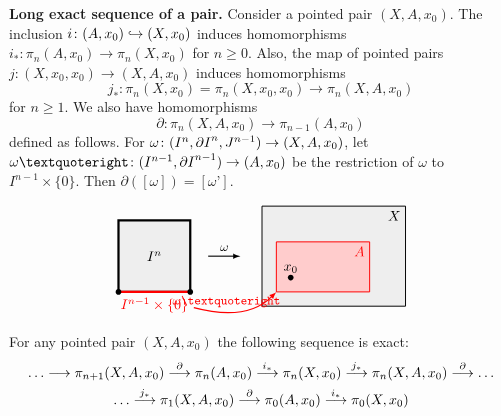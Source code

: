 \begin{nn}{\bf Long exact sequence of a pair.}
Consider a pointed pair $(X, A, x_{0})$. The inclusion $i\colon (A, x_{0}) \hookrightarrow (X, x_{0})$
induces homomorphisms  $i_{\ast}\colon \pi_{n}(A, x_{0}) \to \pi_{n}(X, x_{0})$ for $n\geq 0$. 
Also, the map of pointed pairs $j\colon (X, x_{0}, x_{0}) \to (X, A, x_{0})$ 
induces homomorphisms
\[
j_{\ast}\colon \pi_{n}(X, x_{0}) = \pi_{n}(X, x_{0}, x_{0}) \to \pi_{n}(X, A, x_{0})
\]
for $n\geq 1$. We also have homomorphisms 
\[
\partial \colon \pi_{n}(X, A, x_{0}) \to \pi_{n-1}(A, x_{0})
\]
defined as follows. For $\omega\colon (I^{n}, {\partial I}^{n}, J^{n-1})\to (X, A, x_{0})$, let 
$\omega’\colon (I^{n-1}, \pint^{n-1}) \to (A, x_{0})$ be the restriction of
$\omega$ to $I^{n-1}\times \{0\}$. Then $\partial([\omega]) = [\omega’]$.

\begin{equation*}
\begin{tikzpicture}[
    scale = 1.8,
    d0/.style = {line width = 1.6pt},
    d1/.style= {postaction={decorate}, line width = 1.6pt, decoration={markings, mark=at position 0.55 with {\arrow{stealth}}}},
    d2/.style = {postaction={decorate}, line width = 1.6pt, decoration={markings, mark=at position 0.54 with {\arrow[rotate=9]{stealth}}}},
]

\draw[d0, fill = mygray1] (0,0) rectangle node {$I^{n}$} (1,1);
\draw[d0, red]  (0,0)  --  node[below] {$I^{n-1}\times \{0\}$} (1, 0); 
\fill[] (0, 0) circle (0.04);
\fill[] (1, 0) circle (0.04);

\filldraw[mygray1, draw=black, line width=0.7pt] (2, -0.2) rectangle (4, 1.2);
\filldraw[red!20, draw=red, line width=0.7pt] (2.2, 0.0) rectangle (3.5, 0.7);
\node[anchor=north east, red] at (3.5, 0.7)   {$A$};
\fill[] (2.4, 0.2) circle  (0.04) node[above] {$x_{0}$};

\node[anchor=north east] at (4, 1.2)   {$X$};
\draw[thick, ->, >=latex] (1.25, 0.5) -- node[anchor=south] {\small $\omega$} (1.7, 0.5);

\draw[red,thick, ->, >=latex] (1.05, -0.22) to[out=-15, in=-135] 
node[pos= 0.36, anchor=south] {\small $\omega’$} (2.2, 0.0);
\end{tikzpicture}
\end{equation*}
\end{nn}

\begin{theorem}
\label{HOMOT GPS EXACT SEQ PAIR THM}
For any pointed pair $(X, A, x_{0})$ the following sequence is exact: 
\begin{multline*}
{\dots}\longrightarrow \pi_{n+1}(X, A, x_{0}) \overset{\partial}{\longrightarrow} 
\pi_{n}(A, x_{0}) \overset{i_{\ast}}{\longrightarrow}
\pi_{n}(X, x_{0}) \overset{j_{\ast}}{\longrightarrow}
\pi_{n}(X, A, x_{0}) \overset{\partial}{\longrightarrow} {\dots} \\
{\dots} \overset{j_{\ast}}{\longrightarrow} \pi_{1}(X, A, x_{0}) \overset{\partial}{\longrightarrow} 
\pi_{0}(A, x_{0}) \overset{i_{\ast}}{\longrightarrow} 
\pi_{0}(X, x_{0}) 
\end{multline*}
\end{theorem}

